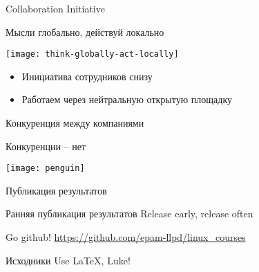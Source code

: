 \begin{frame}{Collaboration Initiative}

  \begin{center}
    Мысли глобально, действуй локально

    \texttt{[image: think-globally-act-locally]}

    \begin{itemize}
      \item Инициатива сотрудников снизу
      \item Работаем через нейтральную открытую площадку
    \end{itemize}

  \end{center}

\end{frame}

\begin{frame}{Конкуренция между компаниями}

  \center\Large\alert{Конкуренции -- нет}

  \center\texttt{[image: penguin]}

\end{frame}


\begin{frame}[fragile]{Публикация результатов}

  \begin{center}
	  \begin{block}{Ранняя публикация результатов}
		  {\Large Release early, release often}
	  \end{block}


	  \begin{block}{Go github!}
		\href{https://github.com/epam-llpd/linux\_courses}{https://github.com/epam-llpd/linux\_courses}
	  \end{block}


	  \begin{block}{Исходники}
		{\Large Use \LaTeX, Luke!}
	  \end{block}

  \end{center}

\end{frame}


